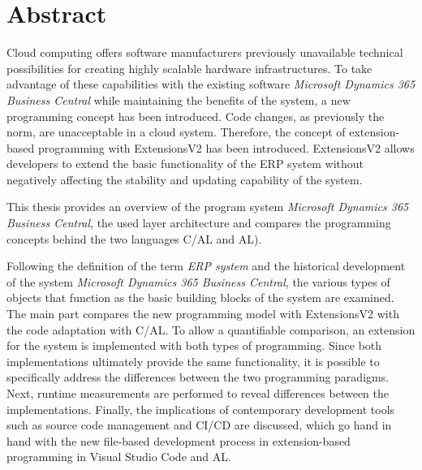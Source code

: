 \chapter{Abstract}
\label{cha:Abstract}

Cloud computing offers software manufacturers previously unavailable technical possibilities for creating highly scalable hardware infrastructures. To take advantage of these capabilities with the existing software \textit{Microsoft Dynamics 365 Business Central} while maintaining the benefits of the system, a new programming concept has been introduced. Code changes, as previously the norm, are unacceptable in a cloud system. Therefore, the concept of extension-based programming with ExtensionsV2 has been introduced. ExtensionsV2 allows developers to extend the basic functionality of the ERP system without negatively affecting the stability and updating capability of the system.


This thesis provides an overview of the program system \textit {Microsoft Dynamics 365 Business Central}, the used layer architecture and compares the programming concepts behind the two languages C/AL and AL).


Following the definition of the term \textit{ERP system} and the historical development of the system \textit{Microsoft Dynamics 365 Business Central}, the various types of objects that function as the basic building blocks of the system are examined. The main part compares the new programming model with ExtensionsV2 with the code adaptation with C/AL. To allow a quantifiable comparison, an extension for the system is implemented with both types of programming. Since both implementations ultimately provide the same functionality, it is possible to specifically address the differences between the two programming paradigms. Next, runtime measurements are performed to reveal differences between the implementations. Finally, the implications of contemporary development tools such as source code management and CI/CD are discussed, which go hand in hand with the new file-based development process in extension-based programming in Visual Studio Code and AL.